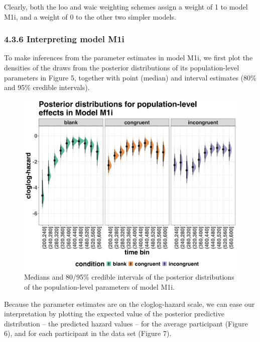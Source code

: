 \documentclass[
  man, donotrepeattitle,floatsintext]{apa6}
\begin{document}
Clearly, both the loo and waic weighting schemes assign a weight of 1 to model M1i, and a weight of 0 to the other two simpler models.

\subsubsection{4.3.6 Interpreting model M1i}\label{interpreting-model-m1i}

To make inferences from the parameter estimates in model M1i, we first plot the densities of the draws from the posterior distributions of its population-level parameters in Figure 5, together with point (median) and interval estimates (80\% and 95\% credible intervals).



\begin{figure}[H]

{\centering \includegraphics[width=0.8\linewidth,height=0.67\textheight,]{../Tutorial_2_Bayesian/figures/M1i_postdistr} 

}

\caption{Medians and 80/95\% credible intervals of the posterior distributions of the population-level parameters of model M1i.}\label{fig:plot-fixed-effects}
\end{figure}

Because the parameter estimates are on the cloglog-hazard scale, we can ease our interpretation by plotting the expected value of the posterior predictive distribution -- the predicted hazard values -- for the average participant (Figure 6), and for each participant in the data set (Figure 7).
\end{document}
